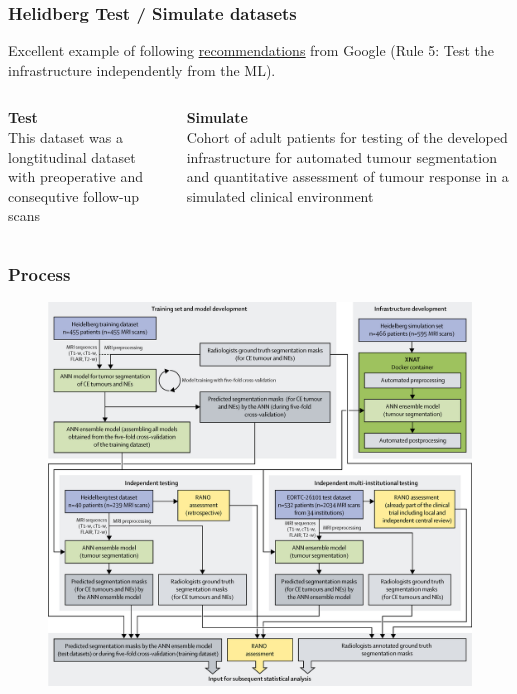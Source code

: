 \documentclass{beamer}
\begin{document}
\begin{frame}
\frametitle{Helidberg Test / Simulate datasets}
Excellent example of following \href{https://developers.google.com/machine-learning/guides/rules-of-ml/}{{\color{blue}\underline{recommendations}}} from Google (Rule 5: Test the infrastructure independently from the ML).
\vskip 1cm
\begin{columns}
	\begin{column}{0.5\textwidth}
		\centering
		\textbf{Test} \\
		This dataset was a longtitudinal dataset with preoperative and consequtive follow-up scans
	\end{column}
	\begin{column}{0.5\textwidth}
		\centering
		\textbf{Simulate} \\
		Cohort of adult patients for testing of the developed infrastructure for automated tumour segmentation and quantitative assessment of tumour response in a simulated clinical environment
	\end{column}
\end{columns}
\end{frame}


\begin{frame}
\frametitle{Process}
\begin{figure}
	\centering
	\includegraphics[height=.9\textheight]{images/im_process.jpg}
\end{figure}
\end{frame}
\end{document}
